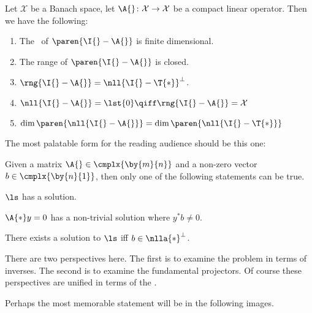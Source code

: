 \begin{thm}
Let $\mathcal{X}$ be a Banach space, let $\A{}\colon \mathcal{X} \to \mathcal{X}$ be a compact linear operator. Then we have the following:
\begin{enumerate}
\item The \ns \ of $\paren{\I{} - \A{}}$ is finite dimensional.
\item The range of $\paren{\I{} - \A{}}$ is closed.
\item $\rng{\I{} - \A{}} = \nll{\I{} - \T{*}}^{\perp}$.
\item $\nll{\I{} - \A{}} = \lst{0} \qiff \rng{\I{} - \A{}} = \mathcal{X}$
\item $\dim\paren{\nll{\I{} - \A{}}} = \dim\paren{\nll{\I{} - \T{*}}}$
\end{enumerate}
\label{thm:fredholm2}
\end{thm}

The most palatable form for the reading audience should be this one:
\begin{thm}
Given a matrix $\A{}\in\cmplx{\by{m}{n}}$ and a non-zero vector $b\in\cmplx{\by{n}{1}}$, then only one of the following statements can be true.

$\ls$ has a solution.

$\A{*}y=0$ has a non-trivial solution where $y^{*}b \ne 0$. 
\end{thm}

There exists a solution to $\ls$ iff $b\in\nlla{*}^{\perp}$.

There are two perspectives here. The first is to examine the problem in terms of inverses. The second is to examine the fundamental projectors. Of course these perspectives are unified in terms of the \ftola.

Perhaps the most memorable statement will be in the following images.

